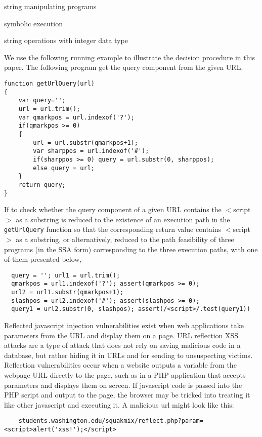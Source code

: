 
string manipulating programs

symbolic execution

string operations with integer data type

We use the following running example to illustrate the decision procedure in this paper. The following program get the query component from the given URL.
{\small
\begin{verbatim}
function getUrlQuery(url)
{
    var query='';
    url = url.trim();
    var qmarkpos = url.indexof('?');
    if(qmarkpos >= 0) 
    {
        url = url.substr(qmarkpos+1);
        var sharppos = url.indexof('#');
        if(sharppos >= 0) query = url.substr(0, sharppos);
        else query = url;
    }
    return query;
}
\end{verbatim}
}


If to check whether the query component of a given URL contains the $<$script$>$ as a substring is reduced to the existence of an execution path in the {\tt getUrlQuery} function so that the corresponding return value contains $<$script$>$ as a substring, or alternatively, reduced to the path feasibility of three programs (in the SSA form) corresponding to the three execution paths, with one of them presented below,

{\small
\begin{verbatim}
  query = ''; url1 = url.trim(); 
  qmarkpos = url1.indexof('?'); assert(qmarkpos >= 0); 
  url2 = url1.substr(qmarkpos+1);
  slashpos = url2.indexof('#'); assert(slashpos >= 0);
  query1 = url2.substr(0, slashpos); assert(/<script>/.test(query1))
\end{verbatim}
}

Reflected javascript injection vulnerabilities exist when web applications take parameters from the URL 
and display them on a page. URL reflection XSS attacks are a type of attack that does not rely on saving 
malicious code in a database, but rather hiding it in URLs and for sending to unsuspecting victims. 
Reflection vulnerabilities occur when a website outputs a variable from the webpage URL directly to the page, 
such as in a PHP application that accepts parameters and displays them on screen. If javascript code is passed 
into the PHP script and output to the page, the browser may be tricked into treating it like other javascript and executing it.
A malicious url might look like this:
\begin{verbatim}
    students.washington.edu/squakmix/reflect.php?param=<script>alert('xss!');</script>
\end{verbatim}

